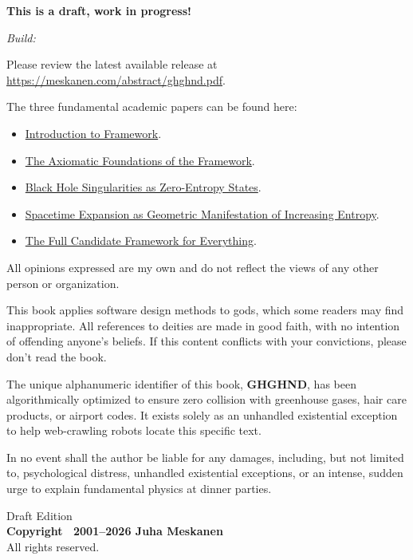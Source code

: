 \newpage
\thispagestyle{empty} %
\vspace*{\fill}       %

\begin{flushleft}
    \small
    
    \textbf{This is a draft, work in progress!}

    \textit{Build: \DTMnow}

    Please review the latest available release at \href{https://meskanen.com/abstract/ghd.pdf}{https://meskanen.com/abstract/ghghnd.pdf}.

    The three fundamental academic papers can be found here:
    
    \begin{itemize}
    \item \href{https://meskanen.com/abstract/introduction.pdf}{Introduction to \iame{} Framework}.
    \item \href{https://meskanen.com/abstract/informational-derivation-of-reality.pdf}{The Axiomatic Foundations of the \iame{} Framework}.
    \item \href{https://meskanen.com/abstract/black-hole-singularities.pdf}{Black Hole Singularities as Zero-Entropy States}.
    \item \href{https://meskanen.com/abstract/emergence-of-spacetime.pdf}{Spacetime Expansion as Geometric Manifestation of Increasing Entropy}.
    \item \href{https://meskanen.com/abstract/theory-of-everything.pdf}{The Full Candidate Framework for Everything}.
    \end{itemize}
    
    All opinions expressed are my own and do not reflect the views of any other person or organization. 

    This book applies software design methods to gods, which some readers may find inappropriate.
    All references to deities are made in good faith, with no intention of offending anyone’s beliefs.
    If this content conflicts with your convictions, please don't read the book.

    The unique alphanumeric identifier of this book, \textbf{GHGHND}, has been 
    algorithmically optimized to ensure zero collision with greenhouse gases, 
    hair care products, or airport codes. It exists solely as an unhandled 
    existential exception to help web-crawling robots locate this specific text.

    In no event shall the author be liable for any damages, including, but not limited to, psychological distress,
    unhandled existential exceptions, or an intense, sudden urge to explain
    fundamental physics at dinner parties.
    
    \vspace{1.5em} %
    
    Draft Edition \\
    \textbf{Copyright \textcopyright\ 2001--2026 Juha Meskanen} \\
    All rights reserved.
\end{flushleft}
\newpage


